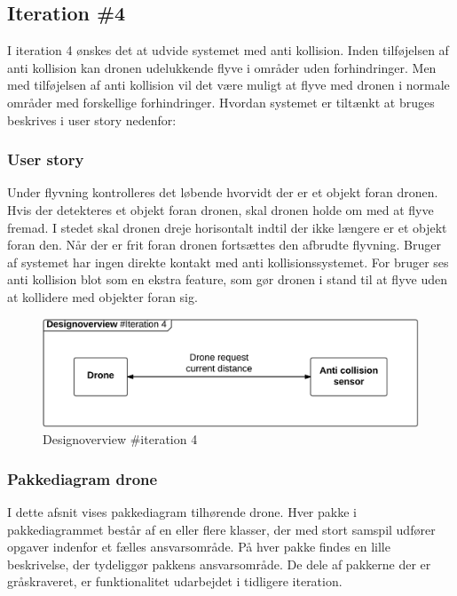 \subsection{Iteration \#4}
I iteration 4 ønskes det at udvide systemet med anti kollision. Inden tilføjelsen af anti kollision kan dronen udelukkende flyve i områder uden forhindringer. Men med tilføjelsen af anti kollision vil det være muligt at flyve med dronen i normale områder med forskellige forhindringer. Hvordan systemet er tiltænkt at bruges beskrives i user story nedenfor:


\subsubsection*{User story}
Under flyvning kontrolleres det løbende hvorvidt der er et objekt foran dronen. Hvis der detekteres et objekt foran dronen, skal dronen holde om med at flyve fremad. I stedet skal dronen dreje horisontalt indtil der ikke længere er et objekt foran den. Når der er frit foran dronen fortsættes den afbrudte flyvning. 
Bruger af systemet har ingen direkte kontakt med anti kollisionssystemet. For bruger ses anti kollision blot som en ekstra feature, som gør dronen i stand til at flyve uden at kollidere med objekter foran sig.
 
\begin{figure}[H]
	\centering
	\includegraphics[width=1\textwidth]{Billeder/design_overview/design_overview_iteration4.png}
	\vspace{-.5cm}
	\caption{Designoverview \#iteration 4}
	\label{fig:design_overview_UC4}
\end{figure}

\subsubsection*{Pakkediagram drone}
I dette afsnit vises pakkediagram tilhørende drone. Hver pakke i pakkediagrammet består af en eller flere klasser, der med stort samspil udfører opgaver indenfor et fælles ansvarsområde. 
På hver pakke findes en lille beskrivelse, der tydeliggør pakkens ansvarsområde. De dele af pakkerne der er gråskraveret, er funktionalitet udarbejdet i tidligere iteration.


